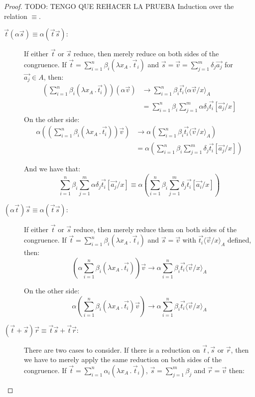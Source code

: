 \documentclass[runningheads,orivec]{llncs}
\newcommand\ansubst[2]{\ensuremath{\langle #1 \rangle_{#2}}}
\def\Lam#1#2#3{\lambda#1_{#2}\,{.}\,#3} %
\def\evalone{\rightarrow}
\begin{document}
\begin{proof}
  {\color{red}TODO: TENGO QUE REHACER LA PRUEBA}
  \iffalse
  Induction over the relation $\equiv$.
  \begin{description}
    \item[$\vec{t} (\alpha\vec{s})\equiv\alpha(\vec{t}\vec{s})$:] If either $\vec{t}$ or $\vec{s}$ reduce, then merely reduce on both sides of the congruence. If $\vec{t} = \sum_{i=1}^{n}\beta_i (\Lam{x}{A}{\vec t_i})$ and $\vec{s}=\vec v= \sum_{j=1}^{m} \delta_j \vec{a_j}$ for $\vec{a_j}\in A$, then:
    \begin{align*}
      (\sum_{i=1}^{n}\beta_i (\Lam{x}{A}{\vec{t_i}})) (\alpha\vec{v})&\evalone\sum_{i=1}^{n}\beta_i \vec{t_i}\ansubst{\alpha\vec{v}/x}{A}\\
      &=\sum_{i=1}^{n}\beta_i \sum_{j=1}^{m}\alpha\delta_j \vec{t_i}[\vec{a_j}/x]
    \end{align*}
    On the other side:
    \begin{align*}  
    \alpha((\sum_{i=1}^{n}\beta_i (\Lam{x}{A}{\vec{t_i}}))\vec v)&\evalone
    \alpha(\sum_{i=1}^{n}\beta_i \vec{t_i}\ansubst{\vec{v}/x}{A})\\
    &=\alpha(\sum_{i=1}^{n}\beta_i\sum_{j=1}^{m}\delta_j\vec{t_i}[\vec{a_j}/x])
    \end{align*}

    And we have that: 
    \[\sum_{i=1}^{n}\beta_i \sum_{j=1}^{m}\alpha\delta_j \vec{t_i}[\vec{a_j}/x] \equiv \alpha(\sum_{i=1}^{n}\beta_i\sum_{j=1}^{m}\delta_j\vec{t_i}[\vec{a_i}/x])\]

    \item[$(\alpha\vec{t})\vec{s}\equiv\alpha(\vec{t}\vec{s})$:] If either $\vec{t}$ or $\vec{s}$ reduce, then merely reduce them on both sides of the congruence. If $\vec{t} = \sum_{i=1}^{n}\beta_i (\Lam{x}{A}{\vec t_i})$ and $\vec{s}=\vec v$ with $\vec{t_i}\ansubst{\vec{v}/x}{A}$ defined, then:
    \[
    (\alpha\sum_{i=1}^{n}\beta_i (\Lam{x}{A}{\vec{t_i}}))\vec v \evalone
    \alpha\sum_{i=1}^{n}\beta_i \vec{t_i}\ansubst{\vec v/x}{A}
    \]
    
    On the other side:
    \[  
      \alpha(\sum_{i=1}^{n}\beta_i (\Lam{x}{A}{\vec{t_i}})\vec v) \evalone
      \alpha\sum_{i=1}^{n}\beta_i \vec{t_i}\ansubst{\vec v/x}{A}
    \]

    \item[$(\vec{t}+\vec{s})\vec{r}\equiv \vec{t}\vec{s} + \vec{t}\vec{r}$:] There are two cases to consider. If there is a reduction on $\vec t,\vec s$ or $\vec r$, then we have to merely apply the same reduction on both sides of the congruence. If $\vec t=\sum_{i=1}^{n}\alpha_i (\Lam{x}{A}{\vec t_i})$, $\vec s=\sum_{j=1}^{m}\beta_j $ and $\vec r= \vec v$ then:
    

\end{description}
\end{proof}
\end{document}
